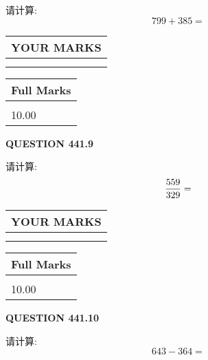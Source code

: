 \documentclass{ctexart}
\begin{document}
  
 
请计算:
\begin{equation}
799 +  %
385 = \nonumber
\end{equation}
 

 

 
  
\vspace{0.2in}
  
\noindent\begin{tabular}{|l|}
\hline
 YOUR MARKS  \\
\hline
 \\ 
 \\ 
\hline
\end{tabular}
\hspace{0.05in} \begin{tabular}{|l|}
\hline
 Full Marks  \\
\hline
 \\ 
10.00 \\
\hline
\end{tabular}
{\textbf{\Large{QUESTION
441.9 
}}}
  
  
 
请计算:
\begin{equation}
\frac { %
559 }  {  %
329} = \nonumber
\end{equation}
 

 

 
  
\vspace{0.2in}
  
\noindent\begin{tabular}{|l|}
\hline
 YOUR MARKS  \\
\hline
 \\ 
 \\ 
\hline
\end{tabular}
\hspace{0.05in} \begin{tabular}{|l|}
\hline
 Full Marks  \\
\hline
 \\ 
10.00 \\
\hline
\end{tabular}
{\textbf{\Large{QUESTION
441.10 
}}}
  
  
 
请计算:
\begin{equation}
643 -   %
364 = \nonumber
\end{equation}
 

 

 
   
\end{document}
